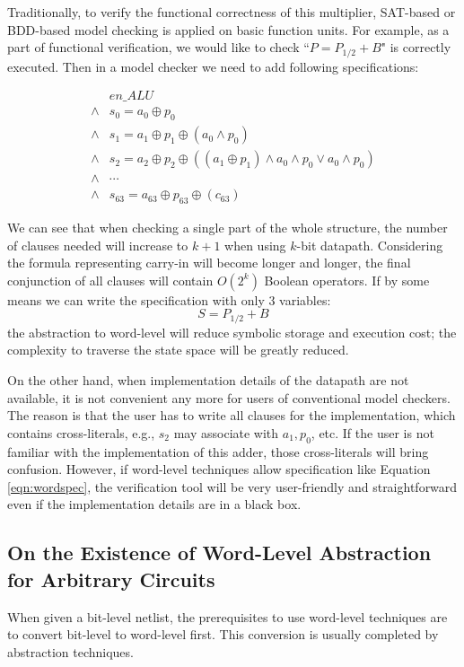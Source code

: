 \begin{Example}
Traditionally, to verify the functional correctness of this multiplier, SAT-based or BDD-based 
model checking is applied on basic function units. For example, as a part of functional verification, 
we would like to check ``$P=P_{1/2}+B$" is correctly executed. Then in a model checker we need to add following 
specifications:

\begin{align*}
& en\_ALU \\
\land & s_0 = a_0 \oplus p_0 \\
\land & s_1 = a_1 \oplus p_1 \oplus (a_0 \land p_0) \\
\land & s_2 = a_2 \oplus p_2 \oplus ((a_1 \oplus p_1) \land a_0 \land p_0 \lor a_0 \land p_0) \\
\land & \cdots \\
\land & s_{63} = a_{63} \oplus p_{63} \oplus (c_{63})
\end{align*}

We can see that when checking a single part of the whole structure, the number of clauses 
needed will increase to $k+1$ when using $k$-bit datapath. Considering the formula representing 
carry-in will become longer and longer, the final conjunction of all clauses will contain 
$O(2^k)$ Boolean operators. If by some means we can write the specification with only 3 variables:
\begin{equation}
\label{eqn:wordspec}
S=P_{1/2}+B
\end{equation}
the abstraction to word-level will reduce symbolic storage and execution cost; the complexity 
to traverse the state space will be greatly reduced.
\end{Example}

On the other hand, when implementation details of the datapath are not available, it is not convenient 
any more for users of conventional model checkers. The reason is that the user has to write all clauses 
for the implementation, which contains cross-literals, e.g., $s_2$ may associate with $a_1, p_0$, etc. If the user 
is not familiar with the implementation of this adder, those cross-literals will bring
confusion. However, if word-level techniques allow specification like Equation \ref{eqn:wordspec},
the verification tool will be very user-friendly and straightforward even if the implementation details
are in a black box.

\subsection{On the Existence of Word-Level Abstraction for Arbitrary Circuits}
When given a bit-level netlist, the prerequisites to use word-level techniques are to convert bit-level 
to word-level first. This conversion is usually completed by abstraction techniques.

